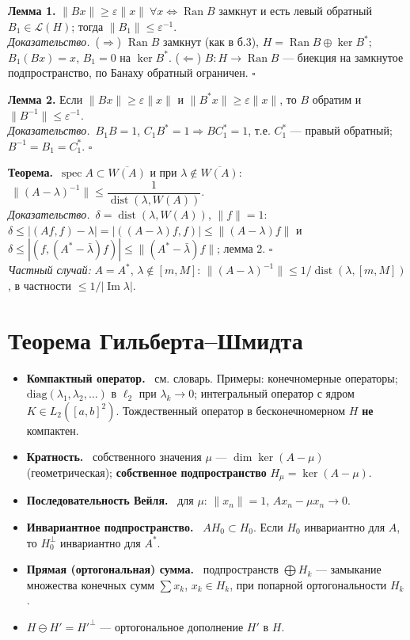 \documentclass[11pt,a4paper]{article}
\newcommand{\Lc}{\mathcal L}
\newcommand{\spec}{\operatorname{spec}}
\newcommand{\Ran}{\operatorname{Ran}}
\newcommand{\dist}{\operatorname{dist}}
\newcommand{\df}[1]{\textbf{#1.}~}
\newcommand{\thm}{\textbf{Теорема.}~}
\newcommand{\pf}{\textit{Доказательство.}~}
\newcommand{\qedd}{\hfill$\square$}
\begin{document}
\textbf{Лемма 1.} $\|Bx\|\ge\varepsilon\|x\|\ \forall x\iff\Ran B$ замкнут и есть левый обратный $B_1\in\Lc(H)$; тогда $\|B_1\|\le\varepsilon^{-1}$.\\
\pf ($\Rightarrow$) $\Ran B$ замкнут (как в б.3), $H=\Ran B\oplus\ker B^*$; $B_1(Bx)=x$, $B_1=0$ на $\ker B^*$. ($\Leftarrow$) $B:H\to\Ran B$ — биекция на замкнутое подпространство, по Банаху обратный ограничен. \qedd

\textbf{Лемма 2.} Если $\|Bx\|\ge\varepsilon\|x\|$ и $\|B^*x\|\ge\varepsilon\|x\|$, то $B$ обратим и $\|B^{-1}\|\le\varepsilon^{-1}$.\\
\pf $B_1B=1$, $C_1B^*=1\Rightarrow BC_1^*=1$, т.е. $C_1^*$ — правый обратный; $B^{-1}=B_1=C_1^*$. \qedd

\thm $\spec A\subset\overline{W(A)}$ и при $\lambda\notin\overline{W(A)}$: $\ \|(A-\lambda)^{-1}\|\le\dfrac1{\dist(\lambda,W(A))}$.\\
\pf $\delta=\dist(\lambda,W(A))$, $\|f\|=1$: $\delta\le|(Af,f)-\lambda|=|((A-\lambda)f,f)|\le\|(A-\lambda)f\|$ и $\delta\le|(f,(A^*-\bar\lambda)f)|\le\|(A^*-\bar\lambda)f\|$; лемма 2. \qedd\\
\textit{Частный случай:} $A=A^*$, $\lambda\notin[m,M]$: $\|(A-\lambda)^{-1}\|\le1/\dist(\lambda,[m,M])$, в частности $\le1/|\operatorname{Im}\lambda|$.

\section{Теорема Гильберта–Шмидта}
\begin{defs}
\begin{itemize}
\item \df{Компактный оператор} см. словарь. Примеры: конечномерные операторы; $\mathrm{diag}(\lambda_1,\lambda_2,\dots)$ в $\ell_2$ при $\lambda_k\to0$; интегральный оператор с ядром $K\in L_2([a,b]^2)$. Тождественный оператор в бесконечномерном $H$ \textbf{не} компактен.
\item \df{Кратность} собственного значения $\mu$ — $\dim\ker(A-\mu)$ (геометрическая); \textbf{собственное подпространство} $H_\mu=\ker(A-\mu)$.
\item \df{Последовательность Вейля} для $\mu$: $\|x_n\|=1$, $Ax_n-\mu x_n\to0$.
\item \df{Инвариантное подпространство} $AH_0\subset H_0$. Если $H_0$ инвариантно для $A$, то $H_0^\perp$ инвариантно для $A^*$.
\item \df{Прямая (ортогональная) сумма} подпространств $\bigoplus H_k$ — замыкание множества конечных сумм $\sum x_k$, $x_k\in H_k$, при попарной ортогональности $H_k$.
\item $H\ominus H'=H'^\perp$ — ортогональное дополнение $H'$ в $H$.
\end{itemize}
\end{defs}
\end{document}
